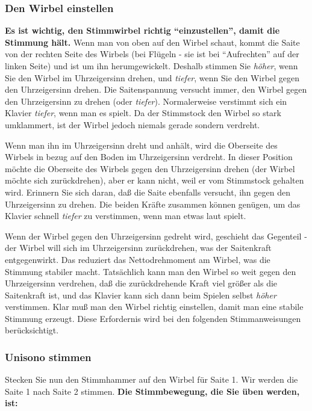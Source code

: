 \label{c2_5c}
\subsubsection{Den Wirbel einstellen}
\label{c2_5_wirb} 

\textbf{Es ist wichtig, den Stimmwirbel richtig \enquote{einzustellen}, damit die Stimmung hält.}
Wenn man von oben auf den Wirbel schaut, kommt die Saite von der rechten Seite des Wirbels (bei Flügeln - sie ist bei \enquote{Aufrechten} auf der linken Seite) und ist um ihn herumgewickelt.
Deshalb stimmen Sie \textit{höher}, wenn Sie den Wirbel im Uhrzeigersinn drehen, und \textit{tiefer}, wenn Sie den Wirbel gegen den Uhrzeigersinn drehen.
Die Saitenspannung versucht immer, den Wirbel gegen den Uhrzeigersinn zu drehen (oder \textit{tiefer}).
Normalerweise verstimmt sich ein Klavier \textit{tiefer}, wenn man es spielt.
Da der Stimmstock den Wirbel so stark umklammert, ist der Wirbel jedoch niemals gerade sondern verdreht.

Wenn man ihn im Uhrzeigersinn dreht und anhält, wird die Oberseite des Wirbels in bezug auf den Boden im Uhrzeigersinn verdreht.
In dieser Position möchte die Oberseite des Wirbels gegen den Uhrzeigersinn drehen (der Wirbel möchte sich zurückdrehen), aber er kann nicht, weil er vom Stimmstock gehalten wird.
Erinnern Sie sich daran, daß die Saite ebenfalls versucht, ihn gegen den Uhrzeigersinn zu drehen.
Die beiden Kräfte zusammen können genügen, um das Klavier schnell \textit{tiefer} zu verstimmen, wenn man etwas laut spielt.

Wenn der Wirbel gegen den Uhrzeigersinn gedreht wird, geschieht das Gegenteil - der Wirbel will sich im Uhrzeigersinn zurückdrehen, was der Saitenkraft entgegenwirkt.
Das reduziert das Nettodrehmoment am Wirbel, was die Stimmung stabiler macht.
Tatsächlich kann man den Wirbel so weit gegen den Uhrzeigersinn verdrehen, daß die zurückdrehende Kraft viel größer als die Saitenkraft ist, und das Klavier kann sich dann beim Spielen selbst \textit{höher} verstimmen.
Klar muß man den Wirbel richtig einstellen, damit man eine stabile Stimmung erzeugt.
Diese Erfordernis wird bei den folgenden Stimmanweisungen berücksichtigt.
 

\label{c2_5d}
\subsubsection{Unisono stimmen}
\label{c2_5_unis}

Stecken Sie nun den Stimmhammer auf den Wirbel für Saite 1.
Wir werden die Saite 1 nach Saite 2 stimmen.
\textbf{Die Stimmbewegung, die Sie üben werden, ist:}

